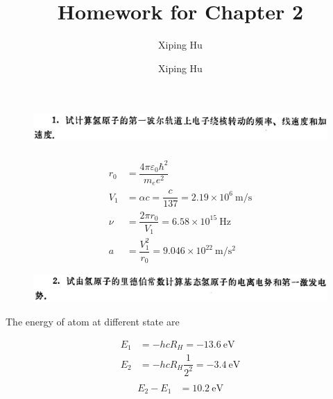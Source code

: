 \documentclass{article}
\author{Xiping Hu}
\author{Xiping Hu}
\affil{https://hxp.plus/}
\title{Homework for Chapter 2}
\begin{document}
\maketitle

\begin{figure}[H]
  \centering
  \includegraphics[width=\linewidth]{figures/Problem1}
  \label{fig:}
\end{figure}

\begin{equation*}
  \begin{aligned}
  \end{aligned}
\end{equation*}
\begin{equation*}
  \begin{aligned}
    r_0 &= \dfrac{4 \pi \varepsilon_0 \hbar^2}{m_e e^2} \\
    V_1 &= \alpha c = \dfrac{c}{137} = 2.19 \times 10^6 \  \mathrm{m/s} \\
    \nu &= \dfrac{2 \pi r_0}{V_1} = 6.58 \times 10^{15} \  \mathrm{Hz} \\
    a &= \dfrac{V_1^2}{r_0} = 9.046 \times 10^{22} \  \mathrm{m/s^2}
  \end{aligned}
\end{equation*}

\begin{figure}[H]
  \centering
  \includegraphics[width=\linewidth]{figures/Problem2}
  \label{fig:}
\end{figure}

The energy of atom at different state are

\begin{equation*}
  \begin{aligned}
    E_1 &= - hc R_H = -13.6 \  \mathrm{eV} \\
    E_2 &= - hc R_H \dfrac{1}{2^2} = -3.4 \  \mathrm{eV} \\
  \end{aligned}
\end{equation*}
\begin{equation*}
  \begin{aligned}
    E_2 - E_1 &= 10.2 \  \mathrm{eV}
  \end{aligned}
\end{equation*}
\end{document}
